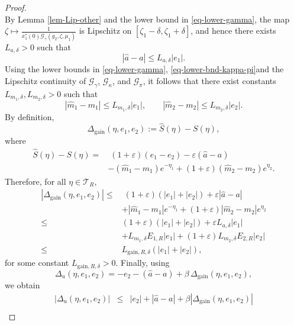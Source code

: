 \documentclass[journal,twoside,web]{ieeecolor}
\begin{document}
\begin{proof}
\begin{equation}
\end{equation}
By Lemma \ref{lem-Lip-other} and the lower bound in \eqref{eq-lower-gamma}, the map $\zeta \mapsto \frac{1}{x_1^*(0)\mathcal{G}_\gamma(g_2,\zeta,\mu_1)}$ is Lipschitz on $[\zeta_1-\delta,\zeta_1+\delta]$, and hence there exists $L_{a,\delta}>0$ such that
\begin{equation}
|\hat a-a|\le L_{a,\delta}|e_1|.
\end{equation}
Using the lower bounds in \eqref{eq-lower-gamma}, \eqref{eq-lower-bnd-kappa-pi}and the Lipschitz continuity of $\mathcal{G}_\gamma$, $\mathcal{G}_\kappa$, and $\mathcal{G}_\pi$, it follows that there exist constants $L_{m_1,\delta},L_{m_2,\delta}>0$ such that
\begin{equation}
|\hat m_1-m_1|\le L_{m_1,\delta}|e_1|,\qquad
|\hat m_2-m_2|\le L_{m_2,\delta}|e_2|.
\end{equation}
By definition,
\begin{equation}
\Delta_{\mathrm{gain}}(\eta,e_1,e_2):= \hat S(\eta)-S(\eta),
\end{equation}
where
\begin{align}
\hat S(\eta)-S(\eta)=&\;(1+\varepsilon)(e_1-e_2)-\varepsilon(\hat a-a)\nonumber \\ &-(\hat m_1-m_1)e^{-\eta_1} +(1+\varepsilon)(\hat m_2-m_2)e^{\eta_2}.
\end{align}
Therefore, for all $\eta\in\mathcal T_{R}$,
\begin{align}
|\Delta_{\mathrm{gain}}(\eta,e_1,e_2)|
\le&\;
(1+\varepsilon)(|e_1|+|e_2|)+\varepsilon|\hat a-a|\nonumber \\ &+|\hat m_1-m_1|e^{-\eta_1}+(1+\varepsilon)|\hat m_2-m_2|e^{\eta_2} \nonumber\\
\le&
(1+\varepsilon)(|e_1|+|e_2|)+\varepsilon L_{a,\delta}|e_1|\nonumber \\ &+L_{m_1,\delta}E_{1,R}|e_1|+(1+\varepsilon)L_{m_2,\delta}E_{2,R}|e_2| \nonumber\\
\le&
L_{\mathrm{gain},R,\delta}(|e_1|+|e_2|),
\end{align}
for some constant $L_{\mathrm{gain},R,\delta}>0$. Finally, using
\begin{equation}
\Delta_u(\eta,e_1,e_2)=-e_2-(\hat a-a)+\beta\,\Delta_{\mathrm{gain}}(\eta,e_1,e_2),
\end{equation}
we obtain
\begin{eqnarray}
|\Delta_u(\eta,e_1,e_2)|
&\le&
|e_2|+|\hat a-a|+\beta|\Delta_{\mathrm{gain}}(\eta,e_1,e_2)| \nonumber\\

\end{eqnarray}
\end{proof}
\end{document}
